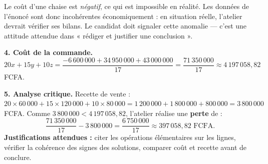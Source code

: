 \documentclass[11pt]{article}
\begin{document}
\begin{corrige}
\begin{attention}
Le coût d'une chaise est \emph{négatif}, ce qui est impossible en réalité. Les données de l'énoncé sont donc incohérentes économiquement : en situation réelle, l'atelier devrait vérifier ses bilans. Le candidat doit signaler cette anomalie — c'est une attitude attendue dans « rédiger et justifier une conclusion ».
\end{attention}

\textbf{4. Coût de la commande.} $20x + 15y + 10z = \dfrac{-6\,600\,000 + 34\,950\,000 + 43\,000\,000}{17} = \dfrac{71\,350\,000}{17} \approx 4\,197\,058,82$ FCFA.

\textbf{5. Analyse critique.} Recette de vente : $20 \times 60\,000 + 15 \times 120\,000 + 10 \times 80\,000 = 1\,200\,000 + 1\,800\,000 + 800\,000 = 3\,800\,000$ FCFA.
Comme $3\,800\,000 < 4\,197\,058,82$, l'atelier réalise une \textbf{perte} de :
\[ \frac{71\,350\,000}{17} - 3\,800\,000 = \frac{6\,750\,000}{17} \approx 397\,058,82 \text{ FCFA}. \]
\textbf{Justifications attendues :} citer les opérations élémentaires sur les lignes, vérifier la cohérence des signes des solutions, comparer coût et recette avant de conclure.
\end{corrige}
\end{document}
